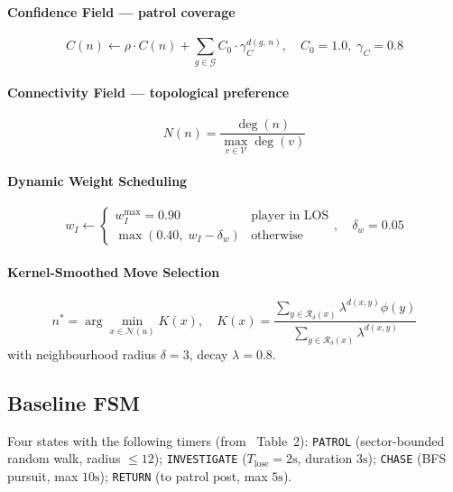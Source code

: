 \documentclass[conference,onecolumn]{IEEEtran}
\begin{document}
\paragraph{Confidence Field --- patrol coverage}
\begin{equation}
  C(n) \leftarrow \rho \cdot C(n)
  + \sum_{g \in \mathcal{G}} C_0 \cdot \gamma_C^{d(g,\, n)},
  \quad C_0 = 1.0,\; \gamma_C = 0.8
\end{equation}

\paragraph{Connectivity Field --- topological preference}
\begin{equation}
  N(n) = \frac{\deg(n)}{\max_{v \in \mathcal{V}} \deg(v)}
\end{equation}

\paragraph{Dynamic Weight Scheduling}
\begin{equation}
  w_I \leftarrow
  \begin{cases}
    w_I^{\max} = 0.90 & \text{player in LOS} \\
    \max(0.40,\; w_I - \delta_w) & \text{otherwise}
  \end{cases},
  \quad \delta_w = 0.05
\end{equation}

\paragraph{Kernel-Smoothed Move Selection}
\begin{equation}
  n^* = \arg\min_{x \in \mathcal{N}(u)} K(x),
  \quad
  K(x) = \frac{\sum_{y \in \mathcal{R}_\delta(x)} \lambda^{d(x,y)} \phi(y)}
              {\sum_{y \in \mathcal{R}_\delta(x)} \lambda^{d(x,y)}}
\end{equation}
with neighbourhood radius $\delta = 3$, decay $\lambda = 0.8$.

\subsection{Baseline FSM}
Four states with the following timers (from~\cite{xu2025} Table~2):
\texttt{PATROL} (sector-bounded random walk, radius $\le 12$);
\texttt{INVESTIGATE} ($T_{\text{lose}} = 2\text{s}$,
duration $3\text{s}$);
\texttt{CHASE} (BFS pursuit, max $10\text{s}$);
\texttt{RETURN} (to patrol post, max $5\text{s}$).
\end{document}
